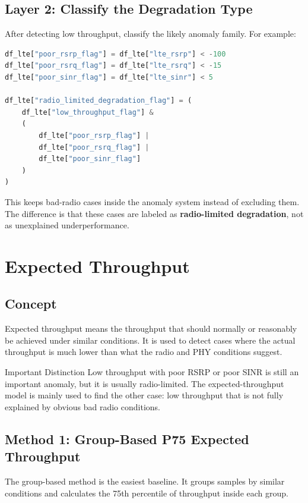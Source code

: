 \documentclass[12pt,a4paper]{article}
\begin{document}
\subsection{Layer 2: Classify the Degradation Type}

After detecting low throughput, classify the likely anomaly family. For example:

\begin{lstlisting}[language=Python]
df_lte["poor_rsrp_flag"] = df_lte["lte_rsrp"] < -100
df_lte["poor_rsrq_flag"] = df_lte["lte_rsrq"] < -15
df_lte["poor_sinr_flag"] = df_lte["lte_sinr"] < 5

df_lte["radio_limited_degradation_flag"] = (
    df_lte["low_throughput_flag"] &
    (
        df_lte["poor_rsrp_flag"] |
        df_lte["poor_rsrq_flag"] |
        df_lte["poor_sinr_flag"]
    )
)
\end{lstlisting}

This keeps bad-radio cases inside the anomaly system instead of excluding them. The difference is that these cases are labeled as \textbf{radio-limited degradation}, not as unexplained underperformance.

\section{Expected Throughput}

\subsection{Concept}

Expected throughput means the throughput that should normally or reasonably be achieved under similar conditions. It is used to detect cases where the actual throughput is much lower than what the radio and PHY conditions suggest.

\begin{infobox}{Important Distinction}
Low throughput with poor RSRP or poor SINR is still an important anomaly, but it is usually radio-limited. The expected-throughput model is mainly used to find the other case: low throughput that is not fully explained by obvious bad radio conditions.
\end{infobox}

\subsection{Method 1: Group-Based P75 Expected Throughput}

The group-based method is the easiest baseline. It groups samples by similar conditions and calculates the 75th percentile of throughput inside each group.
\end{document}
